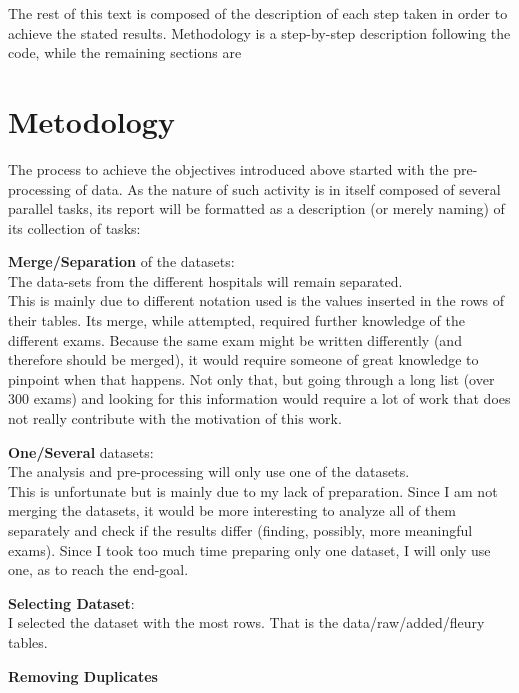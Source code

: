 \documentclass[]{article}
\begin{document}
The rest of this text is composed of the description of each step taken in order to achieve the stated results. Methodology is a step-by-step description following the code, while the remaining sections are 

\section{Metodology}

The process to achieve the objectives introduced above started with the pre-processing of data. As the nature of such activity is in itself composed of several parallel tasks, its report will be formatted as a description (or merely naming) of its collection of tasks:

\begin{description}
	\item \textbf{Merge/Separation} of the datasets:\\
	The data-sets from the different hospitals will remain separated.\\
	This is mainly due to different notation used is the values inserted in the rows of their tables. Its merge, while attempted, required further knowledge of the different exams. Because the same exam might be written differently (and therefore should be merged), it would require someone of great knowledge to pinpoint when that happens. Not only that, but going through a long list (over 300 exams) and looking for this information would require a lot of work that does not really contribute with the motivation of this work.

	\item \textbf{One/Several} datasets:\\
	The analysis and pre-processing will only use one of the datasets.\\
	This is unfortunate but is mainly due to my lack of preparation. Since I am not merging the datasets, it would be more interesting to analyze all of them separately and check if the results differ (finding, possibly, more meaningful exams). Since I took too much time preparing only one dataset, I will only use one, as to reach the end-goal.
	
	\item \textbf{Selecting Dataset}:\\
	I selected the dataset with the most rows. That is the data/raw/added/fleury tables.
	
	\item \textbf{Removing Duplicates}
	

\end{description}
\end{document}

